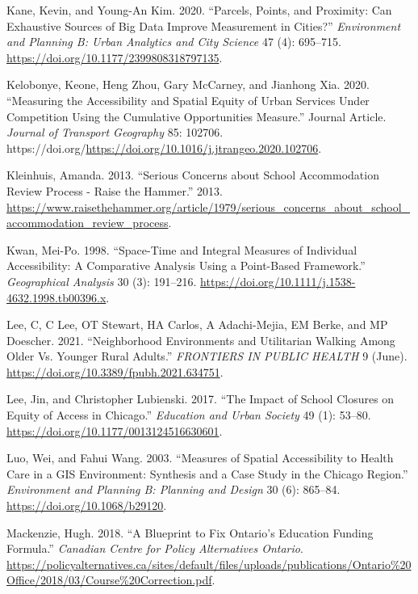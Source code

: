 \documentclass[
default
]{sn-jnl}
\newlength{\cslhangindent}
\newenvironment{CSLReferences}[2] %
 {\begin{list}{}{%
  \setlength{\itemindent}{0pt}
  \setlength{\leftmargin}{0pt}
  \setlength{\parsep}{0pt}
  \ifodd #1
   \setlength{\leftmargin}{\cslhangindent}
   \setlength{\itemindent}{-1\cslhangindent}
  \fi
  \setlength{\itemsep}{#2\baselineskip}}}
 {\end{list}}
\begin{document}
\begin{CSLReferences}{1}{0}
Kane, Kevin, and Young-An Kim. 2020. {``Parcels, Points, and Proximity:
Can Exhaustive Sources of Big Data Improve Measurement in Cities?''}
\emph{Environment and Planning B: Urban Analytics and City Science} 47
(4): 695--715. \url{https://doi.org/10.1177/2399808318797135}.

Kelobonye, Keone, Heng Zhou, Gary McCarney, and Jianhong Xia. 2020.
{``Measuring the Accessibility and Spatial Equity of Urban Services
Under Competition Using the Cumulative Opportunities Measure.''} Journal
Article. \emph{Journal of Transport Geography} 85: 102706.
https://doi.org/\url{https://doi.org/10.1016/j.jtrangeo.2020.102706}.

Kleinhuis, Amanda. 2013. {``Serious Concerns about School Accommodation
Review Process - Raise the Hammer.''} 2013.
\url{https://www.raisethehammer.org/article/1979/serious_concerns_about_school_accommodation_review_process}.

Kwan, Mei-Po. 1998. {``Space-Time and Integral Measures of Individual
Accessibility: A Comparative Analysis Using a Point-Based Framework.''}
\emph{Geographical Analysis} 30 (3): 191--216.
\url{https://doi.org/10.1111/j.1538-4632.1998.tb00396.x}.

Lee, C, C Lee, OT Stewart, HA Carlos, A Adachi-Mejia, EM Berke, and MP
Doescher. 2021. {``Neighborhood Environments and Utilitarian Walking
Among Older Vs. Younger Rural Adults.''} \emph{{FRONTIERS} {IN} {PUBLIC}
{HEALTH}} 9 (June). \url{https://doi.org/10.3389/fpubh.2021.634751}.

Lee, Jin, and Christopher Lubienski. 2017. {``The Impact of School
Closures on Equity of Access in Chicago.''} \emph{Education and Urban
Society} 49 (1): 53--80. \url{https://doi.org/10.1177/0013124516630601}.

Luo, Wei, and Fahui Wang. 2003. {``Measures of {Spatial Accessibility}
to {Health Care} in a {GIS Environment}: {Synthesis} and a {Case Study}
in the {Chicago Region}.''} \emph{Environment and Planning B: Planning
and Design} 30 (6): 865--84. \url{https://doi.org/10.1068/b29120}.

Mackenzie, Hugh. 2018. {``A Blueprint to Fix Ontario's Education Funding
Formula.''} \emph{Canadian Centre for Policy Alternatives {\textbar}
Ontario}.
\url{https://policyalternatives.ca/sites/default/files/uploads/publications/Ontario\%20Office/2018/03/Course\%20Correction.pdf}.


\end{CSLReferences}
\end{document}
